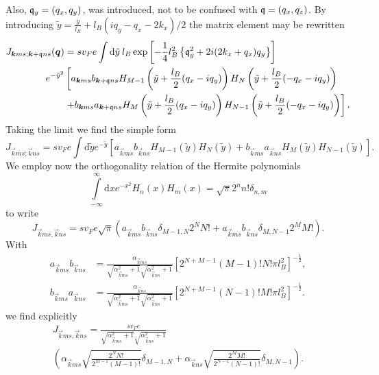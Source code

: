 Also, $\mathfrak{q}_y=(q_x, q_y)$, was introduced, not to be confused with $\mathfrak{q} = (q_x, q_z)$.
By introducing $\tilde{y} = \frac{y}{l_{B}} + l_B(iq_y - q_x - 2 k_x) / 2$ the matrix element may be rewritten
\begin{equation}
  \label{eq:14}
  \begin{split}
    J_{\bm{k}ms; \bm{k}+\mathfrak{q} ns}(\bm{q}) &=
    s v_F e \int \mathrm{d}\tilde{y} \: l_B
\exp \left[- \frac{1}{4} l_B^2 \left\{
    \mathfrak{q}_y^2 + 2 i (2k_x + q_x) q_y 
    \right\}\right]\\
  e^{-\tilde{y}^2}
   &\left[
    a_{\bm{k}ms}b_{\bm{k} + \mathfrak{q} ns}
    H_{M-1} \left( \tilde{y} + \frac{l_B}{2}(q_x - iq_y) \right)
    H_N\left( \tilde{y} + \frac{l_B}{2}(-q_x - iq_y) \right) \right.\\
   &\left. +
    b_{\bm{k}ms} a_{\bm{k} + \mathfrak{q} ns}
    H_M \left( \tilde{y} + \frac{l_B}{2}(q_x - iq_y) \right)
    H_{N-1} \left( \tilde{y} +  \frac{l_B}{2}(-q_x - iq_y)\right)
    \right].
  \end{split}
\end{equation}
Taking the limit we find the simple form
\begin{equation}
  \label{eq:41}
  J_{\vec{k} m s; \vec{k} n s} =
  s v_F e \int \mathrm{d}\tilde{y} e^{-\tilde{y} }
  \left[
    a_{\vec{k}ms} b_{\vec{k} n s} H_{M-1}(\tilde{y} )H_N(\tilde{y} )
    + b_{\vec{k} m s} a _{\vec{k} n s} H_M(\tilde{y} )H_{N-1}(\tilde{y} )
  \right].
\end{equation}
We employ now the orthogonality relation of the Hermite polynomials \cite[Table~18.3.1]{NIST:DLMF}
\begin{equation}
  \label{eq:61}
  \int\limits_{-\infty}^{\infty} \mathrm{d}x e^{-x^2} H_n(x)H_m(x) = \sqrt{\pi} 2^{n} n! \delta_{n,m}
\end{equation}
to write
\begin{equation}
  \label{eq:62}
  J_{\vec{k} m s, \vec{k} n s} = s v_F e \sqrt{\pi} (a_{\vec{k} ms} b_{\vec{k} n s} \delta_{M-1, N} 2^N N! + a_{\vec{k} m s} b_{\vec{k} n s} \delta_{M, N-1} 2^M M!).
\end{equation}
With
\begin{align}
  a_{\vec{k}ms}b_{\vec{k}ns} &= 
  \frac{\alpha_{\vec{k}ms} }{
    \sqrt{\alpha _{\vec{k} ms}^2 +1}
    \sqrt{\alpha _{\vec{k} ns}^2 + 1}
  }
  \left[ 2^{N+M-1} (M-1)! N! \pi l_B^2 \right]^{-\frac{1}{2}},\\
  b_{\vec{k}ms}a_{\vec{k} ns} &= 
  \frac{\alpha_{\vec{k}ns} }{
    \sqrt{\alpha _{\vec{k} ms}^2 +1}
    \sqrt{\alpha _{\vec{k} ns}^2 + 1}
  }
  \left[ 2^{N+M-1} (N-1)! M! \pi l_B^2 \right]^{-\frac{1}{2}}.
\end{align}
we find explicitly
\begin{multline}
  J_{\vec{k} m s, \vec{k} n s} = \frac{s v_F e}{\sqrt{\alpha _{\vec{k} m s}^2 + 1} \sqrt{\alpha _{\vec{k} n s}^2 + 1}}\\
  \left(
    \alpha _{\vec{k} m s}
    \sqrt{\frac{2^{N} N!}{2^{M-1} (M-1)!}} \delta_{M-1, N}
    +
    \alpha _{\vec{k} n s}
    \sqrt{\frac{2^{M} M!}{2^{N-1} (N-1)!}} \delta_{M, N-1}
  \right).
\end{multline}


